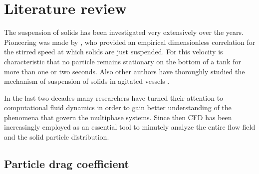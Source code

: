\chapter{Literature review}
The suspension of solids has been investigated very extensively over the years. Pioneering was made by \citet{zwi58}, who provided an empirical dimensionless correlation for the  stirred speed at which solids are just suspended. For this velocity is characteristic that no particle remains stationary on the bottom of a tank for more than one or two seconds. Also other authors have thoroughly studied the mechanism of suspension of solids in agitated vessels \citep{nie68,bal78}.   

In the last two decades many researchers have turned their attention to computational fluid dynamics in order to gain better understanding of the phenomena that govern the multiphase systems. Since then CFD has been increasingly employed as an essential tool to minutely analyze the entire flow field and the solid particle distribution. 

\section{Particle drag coefficient}

